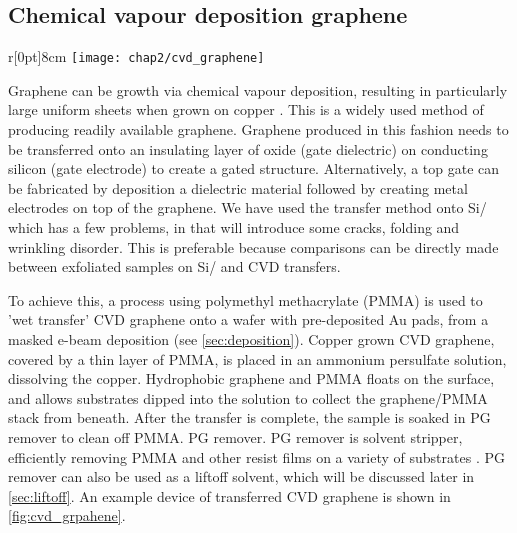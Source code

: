 \documentclass[../../Matt_Gebert_Honours_Thesis.tex]{subfiles}
\begin{document}
	\subsection{Chemical vapour deposition graphene}\label{sec:CVD}
	\begin{wrapfigure}[17]{r}[0pt]{8cm}
		\centering
		\vspace{-0.65cm}
		\texttt{[image: chap2/cvd\_graphene]}
		\caption[CVD graphene grown on Cu transferred onto \silicondioxide{} and Au pads.]{CVD graphene grown on Cu transferred onto \silicondioxide{} and Au pads. The contrast differences due to the autoexposure of the camera software.} \label{fig:cvd_grpahene} 
	\end{wrapfigure}
	Graphene can be growth via chemical vapour deposition, resulting in particularly large uniform sheets when grown on copper \cite{li_large-area_2009}. This is a widely used method of producing readily available graphene. Graphene produced in this fashion needs to be transferred onto an insulating layer of oxide (gate dielectric) on conducting silicon (gate electrode) to create a gated structure. Alternatively, a top gate can be fabricated by deposition a dielectric material followed by creating metal electrodes on top of the graphene. 
	We have used the transfer method onto Si/\silicondioxide{} which has a few problems, in that  will introduce some cracks, folding and wrinkling disorder. This is preferable because comparisons can be directly made between exfoliated samples on Si/\silicondioxide{} and CVD transfers.

	To achieve this, a process\cite{zheng_direct_2017} using polymethyl methacrylate (PMMA) is used to 'wet transfer' CVD graphene onto a \silicondioxide{} wafer with pre-deposited Au pads, from a masked e-beam deposition (see \cref{sec:deposition}). 
	Copper grown CVD graphene, covered by a thin layer of PMMA, is placed in an ammonium persulfate solution, dissolving the copper. Hydrophobic graphene and PMMA floats on the surface, and allows substrates dipped into the solution to collect the graphene/PMMA stack from beneath. After the transfer is complete, the sample is soaked in PG remover to clean off PMMA. PG remover. PG remover is solvent stripper, efficiently removing PMMA and other resist films on a variety of substrates \cite{microchem_pgremover}. PG remover can also be used as a liftoff solvent, which will be discussed later in \cref{sec:liftoff}. An example device of transferred CVD graphene is shown in \cref{fig:cvd_grpahene}.
	
\end{document}
